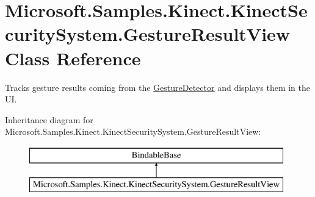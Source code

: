 \hypertarget{class_microsoft_1_1_samples_1_1_kinect_1_1_kinect_security_system_1_1_gesture_result_view}{}\section{Microsoft.\+Samples.\+Kinect.\+Kinect\+Security\+System.\+Gesture\+Result\+View Class Reference}
\label{class_microsoft_1_1_samples_1_1_kinect_1_1_kinect_security_system_1_1_gesture_result_view}


Tracks gesture results coming from the \hyperlink{class_microsoft_1_1_samples_1_1_kinect_1_1_kinect_security_system_1_1_gesture_detector}{Gesture\+Detector} and displays them in the UI.  


Inheritance diagram for Microsoft.\+Samples.\+Kinect.\+Kinect\+Security\+System.\+Gesture\+Result\+View\+:\begin{figure}[H]
\begin{center}
\leavevmode
\includegraphics[height=2.000000cm]{class_microsoft_1_1_samples_1_1_kinect_1_1_kinect_security_system_1_1_gesture_result_view}
\end{center}
\end{figure}

